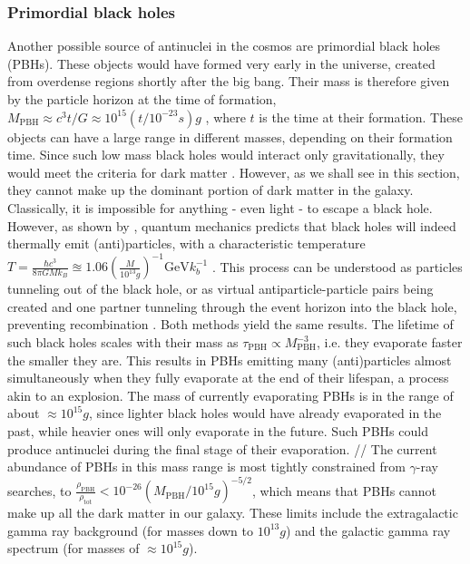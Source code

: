 \subsubsection{Primordial black holes}
Another possible source of antinuclei in the cosmos are primordial black holes (PBHs). These objects would have formed very early in the universe, created from overdense regions shortly after the big bang. Their mass is therefore given by the particle horizon at the time of formation, $M_\mathrm{PBH} \approx c^3t/G \approx 10^{15} (t/10^{-23}s)g$ \cite{}, where $t$ is the time at their formation. These objects can have a large range in different masses, depending on their formation time. Since such low mass black holes would interact only gravitationally, they would meet the criteria for dark matter \cite{}. However, as we shall see in this section, they cannot make up the dominant portion of dark matter in the galaxy. \\
Classically, it is impossible for anything - even light - to escape a black hole. However, as shown by \cite{}, quantum mechanics predicts that black holes will indeed thermally emit (anti)particles, with a characteristic temperature $T = \frac{\hbar c^3}{8\pi GM k_B} \approxeq 1.06 \left( \frac{M}{10^{13}g}\right)^{-1} \mathrm{GeV} k_b^{-1}$ \cite{}. This process can be understood as particles tunneling out of the black hole\cite{}, or as virtual antiparticle-particle pairs being created and one partner tunneling through the event horizon into the black hole, preventing recombination \cite{}. Both methods yield the same results. The lifetime of such black holes scales with their mass as $\tau_\mathrm{PBH} \propto M_\mathrm{PBH}^{-3}$, i.e. they evaporate faster the smaller they are. This results in PBHs emitting many (anti)particles almost simultaneously when they fully evaporate at the end of their lifespan, a process akin to an explosion. The mass of currently evaporating PBHs is in the range of about $\approx 10^{15}g$, since lighter black holes would have already evaporated in the past, while heavier ones will only evaporate in the future. Such PBHs could produce antinuclei during the final stage of their evaporation. //
The current abundance of PBHs in this mass range is most tightly constrained from $\gamma$-ray searches\cite{}, to $\frac{\rho_\mathrm{PBH}}{\rho_\mathrm{tot}} < 10^{-26} (M_\mathrm{PBH}/10^{15}g)^{-5/2}$, which means that PBHs cannot make up all the dark matter in our galaxy. These limits include the extragalactic gamma ray background (for masses down to $10^{13}g$) and the galactic gamma ray spectrum (for masses of $\approx 10^{15}g$).\\

